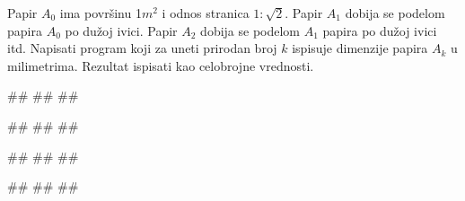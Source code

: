 \begin{Exercise}[difficulty=1, label=1.3_33] 
Papir $A_0$ ima povr\v sinu 1$m^2$ i odnos stranica
$1:\sqrt{2}$. Papir $A_1$ dobija se podelom papira $A_0$ po dužoj
ivici. Papir $A_2$ dobija se podelom $A_1$ papira po dužoj ivici
itd. Napisati program koji za uneti prirodan broj $k$ ispisuje 
dimenzije papira $A_k$ u milimetrima. Rezultat ispisati kao celobrojne
vrednosti.  
  
\begin{miditest}
\begin{upotreba}{1}
#\naslovInt#
##
##
\end{upotreba}
\end{miditest}
\begin{miditest}
\begin{upotreba}{2}
#\naslovInt#
##
##
\end{upotreba}
\end{miditest}

\begin{miditest}
\begin{upotreba}{3}
#\naslovInt#
##
##
\end{upotreba}
\end{miditest}
\begin{miditest}
\begin{upotreba}{4}
#\naslovInt#
##
##
\end{upotreba}
\end{miditest}
\end{Exercise}
\begin{Answer}[ref=1.3_33]
\end{Answer}



